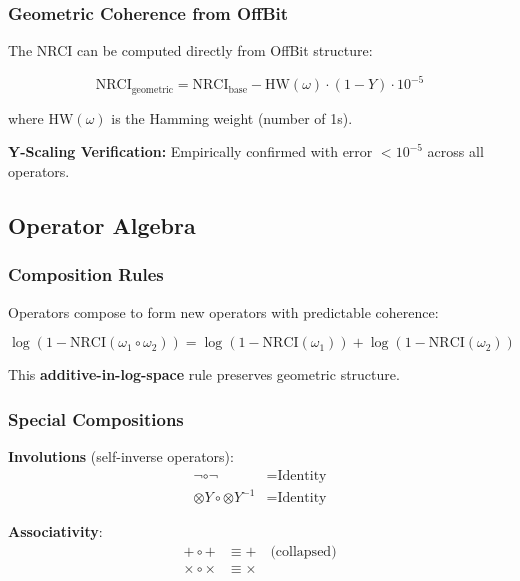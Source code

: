 \subsubsection{Geometric Coherence from OffBit}

The NRCI can be computed directly from OffBit structure:

\begin{equation}
\boxed{\text{NRCI}_{\text{geometric}} = \text{NRCI}_{\text{base}} - \text{HW}(\omega) \cdot (1 - Y) \cdot 10^{-5}}
\end{equation}

where $\text{HW}(\omega)$ is the Hamming weight (number of 1s).

\textbf{Y-Scaling Verification:} Empirically confirmed with error $< 10^{-5}$ across all operators.

\subsection{Operator Algebra}

\subsubsection{Composition Rules}

Operators compose to form new operators with predictable coherence:

\begin{equation}
\log(1 - \text{NRCI}(\omega_1 \circ \omega_2)) = \log(1 - \text{NRCI}(\omega_1)) + \log(1 - \text{NRCI}(\omega_2))
\end{equation}

This \textbf{additive-in-log-space} rule preserves geometric structure.

\subsubsection{Special Compositions}

\textbf{Involutions} (self-inverse operators):
\begin{align}
\neg \circ \neg &= \text{Identity} \\
\otimes Y \circ \otimes Y^{-1} &= \text{Identity}
\end{align}

\textbf{Associativity}:
\begin{align}
+ \circ + &\equiv + \quad \text{(collapsed)} \\
\times \circ \times &\equiv \times
\end{align}

